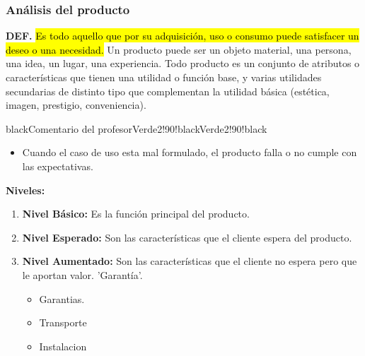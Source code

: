 \documentclass{templateNote}
\newcommand{\hlcolor}[2]{{\sethlcolor{#1}\hl{#2}}}
\begin{document}
\newpage
\subsubsection{Análisis del producto}
\textbf{DEF.} \hlcolor{Amarillo!50}{Es todo aquello que por su adquisición, uso o consumo puede satisfacer un deseo o una necesidad.} Un producto puede ser un objeto material, una persona, una idea, un lugar, una experiencia. \newline
Todo producto es un conjunto de atributos o características que tienen una utilidad o función base, y varias utilidades secundarias de distinto tipo que complementan la utilidad básica (estética, imagen, prestigio, conveniencia).

\begin{CuadroPersonalizado}{black}{Comentario del profesor}{Verde2!90!black}{Verde2!90!black}
  \begin{itemize}
    \item Cuando el caso de uso esta mal formulado, el producto falla o no cumple con las expectativas.
  \end{itemize}
\end{CuadroPersonalizado}
\textbf{Niveles:}
\begin{enumerate}
  \item \textbf{Nivel Básico:} Es la función principal del producto.
  \item \textbf{Nivel Esperado:} Son las características que el cliente espera del producto.
  \item \textbf{Nivel Aumentado:} Son las características que el cliente no espera pero que le aportan valor. 'Garantía'.
  \begin{itemize}
    \item Garantias.
    \item Transporte
    \item Instalacion
  \end{itemize}
\end{enumerate}
\end{document}
